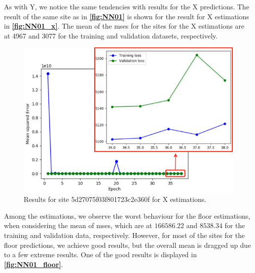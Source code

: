As with Y, we notice the same tendencies with results for the X predictions. The result of the same site as in \textbf{\autoref{fig:NN01}} is shown for the result for X estimations in \textbf{\autoref{fig:NN01_x}}. The mean of the \gls{mse}s for the sites for the X estimations are at 4967 and 3077 for the training and validation datasets, respectively.
\begin{figure}[H]
    \centering
    \includegraphics[scale=0.4]{Images/Experiments/NN/1.initial/5d27075f03f801723c2e360f_x.png}
    \caption{Results for site 5d27075f03f801723c2e360f for X estimations.}
    \label{fig:NN01_x}
\end{figure}
Among the estimations, we observe the worst behaviour for the floor estimations, when considering the mean of \gls{mse}s, which are at $166586.22$ and $8538.34$ for the training and validation data, respectively. However, for most of the sites for the floor predictions, we achieve good results, but the overall mean is dragged up due to a few extreme results. One of the good results is displayed in \textbf{\autoref{fig:NN01_floor}}.
